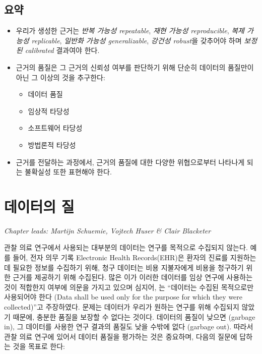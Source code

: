 \documentclass[10.5pt]{book}
\providecommand{\tightlist}{%
  \setlength{\itemsep}{0pt}\setlength{\parskip}{0pt}}
\theoremstyle{definition}
\theoremstyle{definition}
\theoremstyle{definition}
\theoremstyle{remark}
\let\BeginKnitrBlock\begin \let\EndKnitrBlock\end
\begin{document}
\section{요약}\label{-12}

\BeginKnitrBlock{rmdsummary}
\begin{itemize}
\item
  우리가 생성한 근거는 \emph{반복 가능성 repeatable}, \emph{재현 가능성
  reproducible}, \emph{복제 가능성 replicable}, \emph{일반화 가능성
  generalizable}, \emph{강건성 robust}을 갖추어야 하며 \emph{보정된
  calibrated} 결과여야 한다.
\item
  근거의 품질은 그 근거의 신뢰성 여부를 판단하기 위해 단순히 데이터의
  품질만이 아닌 그 이상의 것을 추구한다:

  \begin{itemize}
  \tightlist
  \item
    데이터 품질
  \item
    임상적 타당성
  \item
    소프트웨어 타당성
  \item
    방법론적 타당성
  \end{itemize}
\item
  근거를 전달하는 과정에서, 근거의 품질에 대한 다양한 위협으로부터
  나타나게 되는 불확실성 또한 표현해야 한다.
\end{itemize}
\EndKnitrBlock{rmdsummary}

\chapter{데이터의 질}\label{DataQuality}

\emph{Chapter leads: Martijn Schuemie, Vojtech Huser \& Clair Blacketer}

관찰 의료 연구에서 사용되는 대부분의 데이터는 연구를 목적으로 수집되지
않는다. 예를 들어, 전자 의무 기록 Electronic Health Records(EHR)은
환자의 진료를 지원하는데 필요한 정보를 수집하기 위해, 청구 데이터는 비용
지불자에게 비용을 청구하기 위한 근거를 제공하기 위해 수집된다. 많은 이가
이러한 데이터를 임상 연구에 사용하는 것이 적합한지 여부에 의문을 가지고
있으며 심지어, \citet{vanDerLei_1991} 는 ``데이터는 수집된 목적으로만
사용되어야 한다 (Data shall be used only for the purpose for which they
were collected)''고 주장하였다. 문제는 데이터가 우리가 원하는 연구를
위해 수집되지 않았기 때문에, 충분한 품질을 보장할 수 없다는 것이다.
데이터의 품질이 낮으면 (garbage in), 그 데이터를 사용한 연구 결과의
품질도 낮을 수밖에 없다 (garbage out). 따라서 관찰 의료 연구에 있어서
데이터 품질을 평가하는 것은 중요하며, 다음의 질문에 답하는 것을 목표로
한다:
\end{document}
